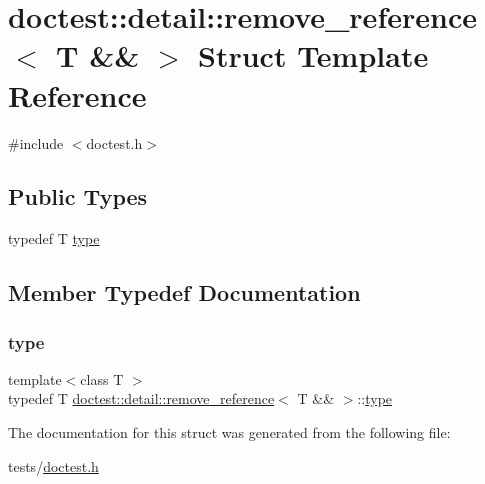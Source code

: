 \hypertarget{structdoctest_1_1detail_1_1remove__reference_3_01T_01_6_6_01_4}{}\section{doctest\+:\+:detail\+:\+:remove\+\_\+reference$<$ T \&\& $>$ Struct Template Reference}
\label{structdoctest_1_1detail_1_1remove__reference_3_01T_01_6_6_01_4}


{\ttfamily \#include $<$doctest.\+h$>$}

\subsection*{Public Types}
\begin{DoxyCompactItemize}
\item 
typedef T \hyperlink{structdoctest_1_1detail_1_1remove__reference_3_01T_01_6_6_01_4_af5f63a14f4e74e0c3c733c00e2f37213}{type}
\end{DoxyCompactItemize}


\subsection{Member Typedef Documentation}
\mbox{\label{structdoctest_1_1detail_1_1remove__reference_3_01T_01_6_6_01_4_af5f63a14f4e74e0c3c733c00e2f37213}} 
\subsubsection{\texorpdfstring{type}{type}}
{\footnotesize\ttfamily template$<$class T $>$ \\
typedef T \hyperlink{structdoctest_1_1detail_1_1remove__reference}{doctest\+::detail\+::remove\+\_\+reference}$<$ T \&\& $>$\+::\hyperlink{structdoctest_1_1detail_1_1remove__reference_3_01T_01_6_6_01_4_af5f63a14f4e74e0c3c733c00e2f37213}{type}}



The documentation for this struct was generated from the following file\+:\begin{DoxyCompactItemize}
\item 
tests/\hyperlink{doctest_8h}{doctest.\+h}\end{DoxyCompactItemize}
